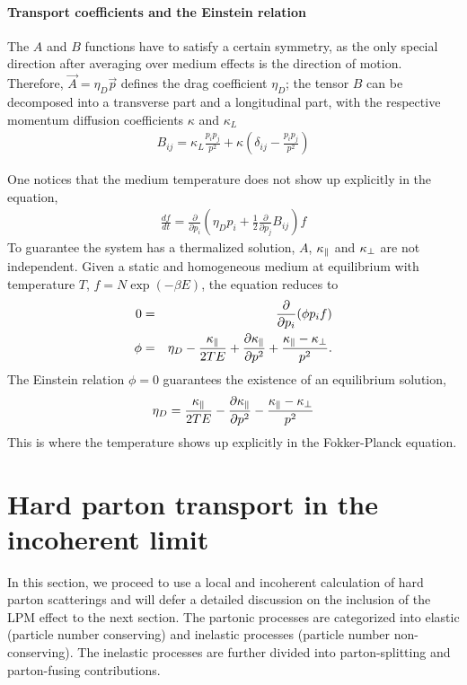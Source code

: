 \paragraph{Transport coefficients and the Einstein relation} 
The $A$ and $B$ functions have to satisfy a certain symmetry, as the only special direction after averaging over medium effects is the direction of motion.
Therefore,  $\vec{A} = \eta_D \vec{p}$ defines the drag coefficient  $\eta_D$; the tensor $B$ can be decomposed into a transverse part and a longitudinal part, with the respective momentum diffusion coefficients $\kappa$ and $\kappa_L$ 
\begin{eqnarray}
B_{ij} = \kappa_L \frac{p_i p_j}{p^2} + \kappa \left(\delta_{ij} - \frac{p_i p_j}{p^2}\right)
\end{eqnarray}

One notices that the medium temperature does not show up explicitly in the equation,
\begin{eqnarray}
\frac{df}{dt} = \frac{\partial}{\partial p_i}\left(\eta_D p_i + \frac{1}{2}\frac{\partial}{\partial p_j} B_{ij}\right)f
\end{eqnarray}
To guarantee the system has a thermalized solution, $A$, $\kappa_{\|}$ and $\kappa_{\perp}$ are not independent.
Given a static and homogeneous medium at equilibrium with temperature $T$, $f = N\exp\left(-\beta E\right)$, the equation reduces to
\begin{eqnarray}
0 &=& \frac{\partial}{\partial p_i}(\phi p_i f)\\
\phi &=& \eta_D - \frac{\kappa_{\|}}{2TE} + \frac{\partial \kappa_{\|}}{\partial p^2} + \frac{\kappa_{\|}-\kappa_{\perp}}{p^2}.
\end{eqnarray}
The Einstein relation $\phi = 0$ guarantees the existence of an equilibrium solution,
\begin{eqnarray}
\eta_D = \frac{\kappa_{\|}}{2TE} - \frac{\partial \kappa_{\|}}{\partial p^2} - \frac{\kappa_{\|}-\kappa_{\perp}}{p^2}
\label{eq:ein-rel}
\end{eqnarray}
This is where the temperature shows up explicitly in the Fokker-Planck equation.

\section{Hard parton transport in the incoherent limit}
In this section, we proceed to use a local and incoherent calculation of hard parton scatterings and will defer a detailed discussion on the inclusion of the LPM effect to the next section.
The partonic processes are categorized into elastic (particle number conserving) and inelastic processes (particle number non-conserving). 
The inelastic processes are further divided into parton-splitting and parton-fusing contributions. 


